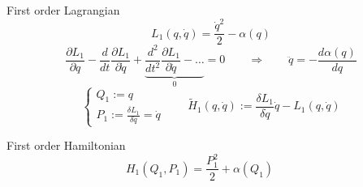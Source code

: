 \documentclass[10pt]{beamer}
\begin{document}
  \begin{frame}{First order Lagrangian}
    \begin{equation*}
      L_1(q, \dot{q}) = \frac{\dot{q}^2}{2} - \alpha(q)
    \end{equation*}
    \vspace{0.2em}
    \begin{equation*} \label{eq: first-order_motion_eq_lagr}
      \frac{\partial L_1}{\partial q} -
      \frac{d}{dt}\frac{\partial L_1}{\partial \dot{q}} +
      \underbrace{
      \frac{d^2}{dt^2}\frac{\partial L_1}{\partial \ddot{q}} - \ldots }_0 = 0
      \qquad \Rightarrow \qquad
      \ddot{q} = - \frac{d\alpha(q)}{dq}
    \end{equation*}
    \begin{equation*}
      \begin{cases}
        Q_1 := q \\
        P_1 := \frac{\delta L_1}{\delta \dot{q}} = \dot{q}
      \end{cases}
      \qquad
      \tilde{H}_1(q, \dot{q}) :=
      \frac{\delta L_1}{\delta \dot{q}} \dot{q} - L_1(q, \dot{q})
    \end{equation*}
    \begin{block}{First order Hamiltonian}
      \begin{equation*} \label{eq: first-order_motion_eq_ham}
        H_1(Q_1, P_1) = \frac{P_1^2}{2} + \alpha(Q_1) \qquad
      \end{equation*}
    \end{block}
  \end{frame}
\end{document}
